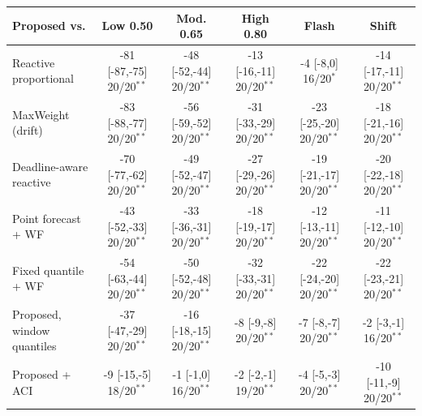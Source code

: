 \begin{tabular}{lccccc}
\hline
Proposed vs. & Low 0.50 & Mod. 0.65 & High 0.80 & Flash & Shift \\
\hline
Reactive proportional & -81 [-87,-75] 20/20$^{\ast\ast}$ & -48 [-52,-44] 20/20$^{\ast\ast}$ & -13 [-16,-11] 20/20$^{\ast\ast}$ & -4 [-8,0] 16/20$^{\ast}$ & -14 [-17,-11] 20/20$^{\ast\ast}$ \\
MaxWeight (drift) & -83 [-88,-77] 20/20$^{\ast\ast}$ & -56 [-59,-52] 20/20$^{\ast\ast}$ & -31 [-33,-29] 20/20$^{\ast\ast}$ & -23 [-25,-20] 20/20$^{\ast\ast}$ & -18 [-21,-16] 20/20$^{\ast\ast}$ \\
Deadline-aware reactive & -70 [-77,-62] 20/20$^{\ast\ast}$ & -49 [-52,-47] 20/20$^{\ast\ast}$ & -27 [-29,-26] 20/20$^{\ast\ast}$ & -19 [-21,-17] 20/20$^{\ast\ast}$ & -20 [-22,-18] 20/20$^{\ast\ast}$ \\
Point forecast + WF & -43 [-52,-33] 20/20$^{\ast\ast}$ & -33 [-36,-31] 20/20$^{\ast\ast}$ & -18 [-19,-17] 20/20$^{\ast\ast}$ & -12 [-13,-11] 20/20$^{\ast\ast}$ & -11 [-12,-10] 20/20$^{\ast\ast}$ \\
Fixed quantile + WF & -54 [-63,-44] 20/20$^{\ast\ast}$ & -50 [-52,-48] 20/20$^{\ast\ast}$ & -32 [-33,-31] 20/20$^{\ast\ast}$ & -22 [-24,-20] 20/20$^{\ast\ast}$ & -22 [-23,-21] 20/20$^{\ast\ast}$ \\
Proposed, window quantiles & -37 [-47,-29] 20/20$^{\ast\ast}$ & -16 [-18,-15] 20/20$^{\ast\ast}$ & -8 [-9,-8] 20/20$^{\ast\ast}$ & -7 [-8,-7] 20/20$^{\ast\ast}$ & -2 [-3,-1] 16/20$^{\ast\ast}$ \\
Proposed + ACI & -9 [-15,-5] 18/20$^{\ast\ast}$ & -1 [-1,0] 16/20$^{\ast\ast}$ & -2 [-2,-1] 19/20$^{\ast\ast}$ & -4 [-5,-3] 20/20$^{\ast\ast}$ & -10 [-11,-9] 20/20$^{\ast\ast}$ \\
\hline
\end{tabular}
